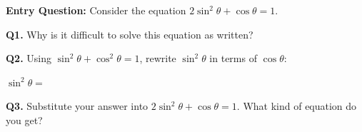 \documentclass[10pt]{article}
\begin{document}
\begin{hookbox}
\textbf{Entry Question:} Consider the equation $2\sin^2\theta + \cos\theta = 1$.

\vspace{4pt}
\textbf{Q1.} Why is it difficult to solve this equation as written?


\textbf{Q2.} Using $\sin^2\theta + \cos^2\theta = 1$, rewrite $\sin^2\theta$
in terms of $\cos\theta$:

\vspace{3pt}
$\sin^2\theta = $ \underline{\hspace{4cm}}

\vspace{4pt}
\textbf{Q3.} Substitute your answer into $2\sin^2\theta + \cos\theta = 1$.
What kind of equation do you get?

\end{hookbox}

\vspace{0.08in}
\end{document}
